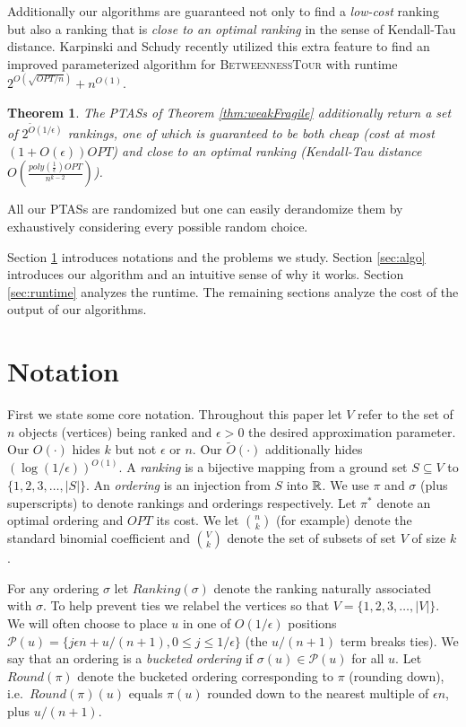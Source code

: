 \documentclass[dvips,11pt,letter]{article}
\newcommand{\set}[1]{\{#1\}}                        \newcommand{\setof}[2]{\{\,{#1}\::\:{#2}\,\}}        \newcommand{\groupFrac}[2]{\left(\frac{#1}{#2}\right)}
\newtheorem{theorem}{Theorem} \newtheorem{conjecture}[theorem]{Conjecture}
\newcommand{\betTour}{\textsc{BetweennessTour}}
\newcommand{\posns}{\mathcal{P}}
\begin{document}
Additionally our algorithms are guaranteed not only to find a \emph{low-cost} ranking but also a ranking that is \emph{close to an optimal ranking} in the sense of Kendall-Tau distance. Karpinski and Schudy \cite{karpinski10exact} recently utilized this extra feature to find an improved parameterized algorithm for \betTour{} with runtime $2^{O(\sqrt{OPT/n})} + n^{O(1)}$.

\begin{theorem}
The PTASs of Theorem \ref{thm:weakFragile} additionally return a set of $2^{\tilde O(1/\epsilon)}$ rankings, one of which is guaranteed to be both cheap (cost at most $(1+O(\epsilon))OPT$) and close to an optimal ranking (Kendall-Tau distance $O\left(\frac{poly\left(\frac{1}{\epsilon}\right)OPT}{n^{k-2}}\right)$).
\end{theorem}

All our PTASs are randomized but one can easily derandomize them by exhaustively considering every possible random choice.

\medskip

Section \ref{sec:notation} introduces notations and the problems we study. Section \ref{sec:algo} introduces our algorithm and an intuitive sense of why it works. Section \ref{sec:runtime} analyzes the runtime. The remaining sections analyze the cost of the output of our algorithms.

\section{Notation}\label{sec:notation}
First we state some core notation. Throughout this paper let $V$ refer to the set of $n$ objects (vertices) being ranked and $\epsilon>0$ the desired approximation parameter. Our $O(\cdot)$ hides $k$ but not $\epsilon$ or $n$. Our $\tilde O(\cdot)$ additionally hides $(\log (1/\epsilon))^{O(1)}$. A \emph{ranking} is a bijective mapping from a ground set $S \subseteq V$ to $\set{1,2,3,\ldots,|S|}$. An \emph{ordering} is an injection from $S$ into $\mathbb{R}$. We use $\pi$ and $\sigma$ (plus superscripts) to denote rankings and orderings respectively. Let $\pi^*$ denote an optimal ordering and $OPT$ its cost. We let $\binom{n}{k}$ (for example) denote the standard binomial coefficient and $\binom{V}{k}$ denote the set of subsets of set $V$ of size $k$.

For any ordering $\sigma$ let $Ranking(\sigma)$ denote the ranking naturally associated with $\sigma$. To help prevent ties we relabel the vertices so that $V = \set{1,2,3,\ldots,|V|}$.
We will often choose to place $u$ in one of $O(1/\epsilon)$ positions $\posns(u) = \set{j \epsilon n + u/(n+1), 0 \le j \le 1/\epsilon}$ (the $u/(n+1)$ term breaks ties).
We say that an ordering is a \emph{bucketed ordering} if $\sigma(u) \in \posns(u)$ for all $u$.
Let $Round(\pi)$ denote the bucketed ordering corresponding to $\pi$ (rounding down), i.e.\ $Round(\pi)(u)$ equals $\pi(u)$ rounded down to the nearest multiple of $\epsilon n$, plus $u/(n+1)$.
\end{document}
